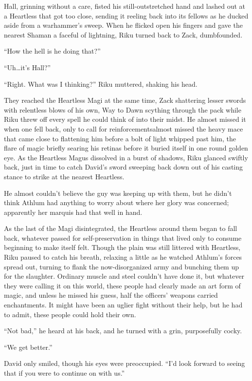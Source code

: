 Hall, grinning without a care, fisted his still-outstretched hand and lashed out at a Heartless that got too close, sending it reeling back into its fellows as he ducked aside from a warhammer's sweep. When he flicked open his fingers and gave the nearest Shaman a faceful of lightning, Riku turned back to Zack, dumbfounded.

``How the hell is he doing that?''

``Uh\ldots it's Hall?''

``Right. What was I thinking?'' Riku muttered, shaking his head.

They reached the Heartless Magi at the same time, Zack shattering lesser swords with relentless blows of his own, Way to Dawn scything through the pack while Riku threw off every spell he could think of into their midst. He almost missed it when one fell back, only to call for reinforcements\textemdash almost missed the heavy mace that came close to flattening him before a bolt of light whipped past him, the flare of magic briefly searing his retinas before it buried itself in one round golden eye. As the Heartless Magus dissolved in a burst of shadows, Riku glanced swiftly back, just in time to catch David's sword sweeping back down out of his casting stance to strike at the nearest Heartless.

He almost couldn't believe the guy was keeping up with them, but he didn't think Athlum had anything to worry about where her glory was concerned; apparently her marquis had that well in hand.

As the last of the Magi disintegrated, the Heartless around them began to fall back, whatever passed for self-preservation in things that lived only to consume beginning to make itself felt. Though the plain was still littered with Heartless, Riku paused to catch his breath, relaxing a little as he watched Athlum's forces spread out, turning to flank the now-disorganized army and bunching them up for the slaughter. Ordinary muscle and steel couldn't have done it, but whatever they were calling it on this world, these people had clearly made an art form of magic, and unless he missed his guess, half the officers' weapons carried enchantments. It might have been an uglier fight without their help, but he had to admit, these people could hold their own.

``Not bad,'' he heard at his back, and he turned with a grin, purposefully cocky.

``We get better.''

David only smiled, though his eyes were preoccupied. ``I'd look forward to seeing that if you were to continue on with us.''

